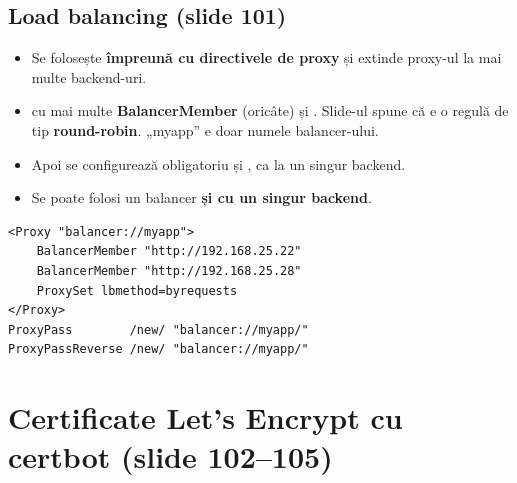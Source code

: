 \documentclass[11pt,a4paper]{article}
\begin{document}
\subsection*{Load balancing (slide 101)}
\begin{itemize}
  \item Se folosește \textbf{împreună cu directivele de proxy} și extinde proxy-ul la mai multe backend-uri.
  \item {} cu mai multe \textbf{BalancerMember} (oricâte) și . Slide-ul spune că e o regulă de tip \textbf{round-robin}. „myapp” e doar numele balancer-ului.
  \item Apoi se configurează obligatoriu  și , ca la un singur backend.
  \item Se poate folosi un balancer \textbf{și cu un singur backend}.
\end{itemize}
\begin{lstlisting}
<Proxy "balancer://myapp">
    BalancerMember "http://192.168.25.22"
    BalancerMember "http://192.168.25.28"
    ProxySet lbmethod=byrequests
</Proxy>
ProxyPass        /new/ "balancer://myapp/"
ProxyPassReverse /new/ "balancer://myapp/"
\end{lstlisting}


\section{Certificate Let's Encrypt cu certbot (slide 102--105)}
\end{document}
